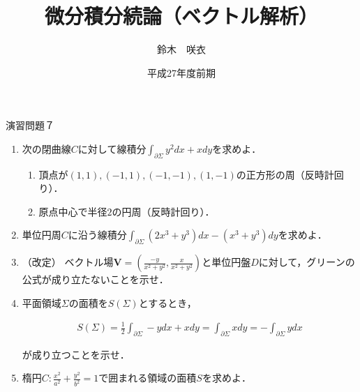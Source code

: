 \documentclass{jarticle}
\begin{document}
\title{微分積分続論（ベクトル解析）} 
\author{鈴木　咲衣}
\date{平成27年度前期}
\maketitle

\begin{center} {\Large 演習問題７ } \end{center}
\begin{enumerate}
\item \cite[練習問題5.5]{tani} 次の閉曲線$C$に対して線積分$\int_{\partial \Sigma}y^{2}dx + xdy$を求めよ．
\begin{enumerate}
\item 頂点が$(1,1), (-1,1), (-1,-1), (1,-1)$の正方形の周（反時計回り）．
\item 原点中心で半径$2$の円周（反時計回り）．
\end{enumerate}
\item \cite[練習問題5.3]{tani} 単位円周$C$に沿う線積分$\int_{\partial \Sigma}(2x^{3}+y^{3})dx -  (x^{3}+y^{3})dy$を求めよ．
\item  （改定）\cite[練習問題5.4]{tani} ベクトル場$\bm V=(\frac{-y}{x^{2}+y^{2}}, \frac{x}{x^{2}+y^{2}})$と単位円盤$D$に対して，グリーンの公式が成り立たないことを示せ．
\item \cite[問題8.8, 8.2]{koba} 平面領域$\Sigma$の面積を$S(\Sigma)$とするとき，


\begin{align}
S(\Sigma)=\frac{1}{2}\int _{\partial \Sigma}-ydx+xdy =
\int _{\partial \Sigma}xdy=
-\int _{\partial \Sigma}ydx
\end{align}

が成り立つことを示せ．
\item \cite[問題8.9]{koba} 楕円$C: \frac{x^{2}}{a^{2}}+\frac{y^{2}}{b^{2}}=1$で囲まれる領域の面積$S$を求めよ．

\end{enumerate}
\newpage
\end{document}
